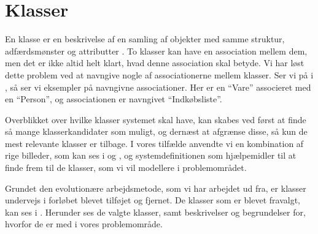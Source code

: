 \section{Klasser}
\label{sec:klasser}

En klasse er en beskrivelse af en samling af objekter med samme struktur, adfærdsmønster og attributter \cite[s. ~51]{ooad}. To klasser kan have en association mellem dem, men det er ikke altid helt klart, hvad denne association skal betyde. Vi har løst dette problem ved at navngive nogle af associationerne mellem klasser. Ser vi på  i , så ser vi eksempler på navngivne associationer. Her er en ``Vare'' associeret med en ``Person'', og associationen er navngivet ``Indkøbsliste''. 

Overblikket over hvilke klasser systemet skal have, kan skabes ved først at finde så mange klasserkandidater som muligt, og dernæst at afgrænse disse, så kun de mest relevante klasser er tilbage. I vores tilfælde anvendte vi en kombination af rige billeder, som kan ses i  og , og systemdefinitionen som hjælpemidler til at finde frem til de klasser, som vi vil modellere i problemområdet.

Grundet den evolutionære arbejdsmetode, som vi har arbejdet ud fra, er klasser undervejs i forløbet blevet tilføjet og fjernet. De klasser som er blevet fravalgt, kan ses i . Herunder ses de valgte klasser, samt beskrivelser og begrundelser for, hvorfor de er med i vores problemområde.

